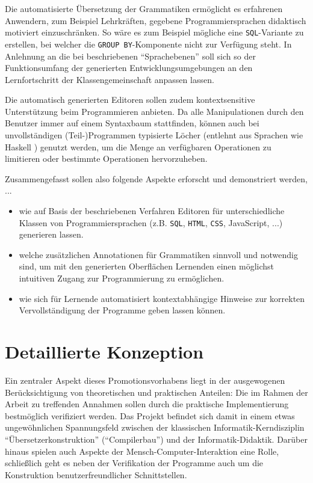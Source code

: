 \documentclass[paper=a4,fontsize=12pt,parskip=half]{scrartcl}
\begin{document}
Die automatisierte Übersetzung der Grammatiken ermöglicht es erfahrenen Anwendern, zum Beispiel Lehrkräften, gegebene Programmiersprachen didaktisch motiviert einzuschränken. So wäre es zum Beispiel mögliche eine \texttt{SQL}-Variante zu erstellen, bei welcher die \texttt{GROUP BY}-Komponente nicht zur Verfügung steht. In Anlehnung an die bei \cite{klaeren_macht_2007} beschriebenen \enquote{Sprachebenen} soll sich so der Funktionsumfang der generierten Entwicklungsumgebungen an den Lernfortschritt der Klassengemeinschaft anpassen lassen.

Die automatisch generierten Editoren sollen zudem kontextsensitive Unterstützung beim Programmieren anbieten. Da alle Manipulationen durch den Benutzer immer auf einem Syntaxbaum stattfinden, können auch bei unvollständigen (Teil-)Programmen typisierte Löcher (entlehnt aus Sprachen wie Haskell \cite{jones_haskell_2014}) genutzt werden, um die Menge an verfügbaren Operationen zu limitieren oder bestimmte Operationen hervorzuheben.

Zusammengefasst sollen also folgende Aspekte erforscht und demonstriert werden, ...

\begin{itemize}
\item wie auf Basis der beschriebenen Verfahren Editoren für unterschiedliche Klassen von Programmiersprachen (z.B. \texttt{SQL}, \texttt{HTML}, \texttt{CSS}, JavaScript, ...) generieren lassen.
\item welche zusätzlichen Annotationen für Grammatiken sinnvoll und notwendig sind, um mit den generierten Oberflächen Lernenden einen möglichst intuitiven Zugang zur Programmierung zu ermöglichen.
\item wie sich für Lernende automatisiert kontextabhängige Hinweise zur korrekten Vervollständigung der Programme geben lassen können.
\end{itemize}


\section{Detaillierte Konzeption}

Ein zentraler Aspekt dieses Promotionsvorhabens liegt in der ausgewogenen Berücksichtigung von theoretischen und praktischen Anteilen: Die im Rahmen der Arbeit zu treffenden Annahmen sollen durch die praktische Implementierung bestmöglich verifiziert werden. Das Projekt befindet sich damit in einem etwas ungewöhnlichen Spannungsfeld zwischen der klassischen Informatik-Kerndisziplin \enquote{Übersetzerkonstruktion} (\enquote{Compilerbau}) und der Informatik-Didaktik. Darüber hinaus spielen auch Aspekte der Mensch-Computer-Interaktion eine Rolle, schließlich geht es neben der Verifikation der Programme auch um die Konstruktion benutzerfreundlicher Schnittstellen.
\end{document}
